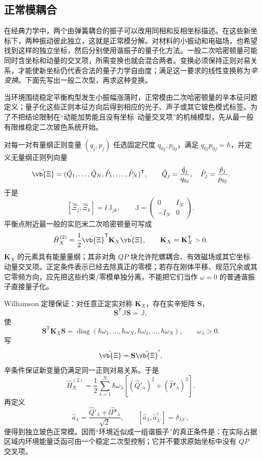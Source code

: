 

\subsection{正常模耦合}

在经典力学中，两个由弹簧耦合的振子可以改用同相和反相坐标描述。在这些新坐标下，两种振动彼此独立，这就是正常模分解。对材料的小振动和电磁场，也希望找到这样的独立坐标，然后分别使用谐振子的量子化方法。一般二次哈密顿量可能同时含坐标和动量的交叉项，所需变换也就会混合两者。变换必须保持正则对易关系，才能使新坐标仍代表合法的量子力学自由度；满足这一要求的线性变换称为\emph{辛变换}。下面先写出一般二次型，再求这种变换。

当环境围绕稳定平衡构型发生小振幅涨落时，正常模由二次哈密顿量的辛本征问题定义；量子化这些正则本征方向后得到相应的光子、声子或其它玻色模式标签。为了不把结论限制在“动能加势能且没有坐标--动量交叉项”的机械模型，先从最一般有限维稳定二次玻色系统开始。

对每一对有量纲正则变量 $(q_j,p_j)$ 任选固定尺度 $q_{0j},p_{0j}$，满足 $q_{0j}p_{0j}=\hbar$，并定义无量纲正则列向量
\[
\hat{\vb{\Xi}}
=
(\hat Q_1,\ldots,\hat Q_N,\hat P_1,\ldots,\hat P_N)^{\mathsf T},
\qquad
\hat Q_j=\frac{\hat q_j}{q_{0j}},
\quad
\hat P_j=\frac{\hat p_j}{p_{0j}}.
\]
于是
\[
[\hat\Xi_j,\hat\Xi_k]
=\ii\,\mathbb J_{jk},
\qquad
\mathbb J=
\begin{pmatrix}
0&I_N\\
-I_N&0
\end{pmatrix}.
\]
平衡点附近最一般的实厄米二次哈密顿量可写成
\begin{equation}
{
\hat H_X^{(2)}
=
\frac12
\hat{\vb{\Xi}}^{\mathsf T}
\mathbf K_X
\hat{\vb{\Xi}},
\qquad
\mathbf K_X=\mathbf K_X^{\mathsf T}>0 .}
\label{eq:general_environment_quadratic_hamiltonian}
\end{equation}
$\mathbf K_X$ 的元素具有能量量纲；其非对角 $QP$ 块允许陀螺耦合、有效磁场或其它坐标--动量交叉项。正定条件表示已经去除真正的零模；若存在刚体平移、规范冗余或其它零频方向，应先把这些约束/零模单独分离，不能把它们当作 $\omega=0$ 的普通谐振子直接量子化。

Williamson 定理保证：对任意正定实对称 $\mathbf K_X$，存在实辛矩阵 $\mathbf S$，
\[
\mathbf S^{\mathsf T}\mathbb J\mathbf S=\mathbb J,
\]
使
\[
\mathbf S^{\mathsf T}\mathbf K_X\mathbf S
=
\operatorname{diag}
(\hbar\omega_1,\ldots,\hbar\omega_N,
 \hbar\omega_1,\ldots,\hbar\omega_N),
\qquad
\omega_\lambda>0.
\]
写
\[
\hat{\vb{\Xi}}
=\mathbf S\hat{\vb{\Xi}}',
\]
辛条件保证新变量仍满足同一正则对易关系。于是
\[
\hat H_X^{(2)}
=
\frac12\sum_{\lambda=1}^{N}
\hbar\omega_\lambda
\left[
(\hat Q'_\lambda)^2+(\hat P'_\lambda)^2
\right].
\]
再定义
\[
\hat a_\lambda
=
\frac{\hat Q'_\lambda+\ii\hat P'_\lambda}{\sqrt2},
\qquad
[\hat a_\lambda,\hat a_{\lambda'}^\dagger]
=\delta_{\lambda\lambda'},
\]
便得到独立玻色正常模。因而“环境近似成一组谐振子”的真正条件是：在实际占据区域内环境能量泛函可由一个稳定二次型控制；它并不要求原始坐标中没有 $QP$ 交叉项。


